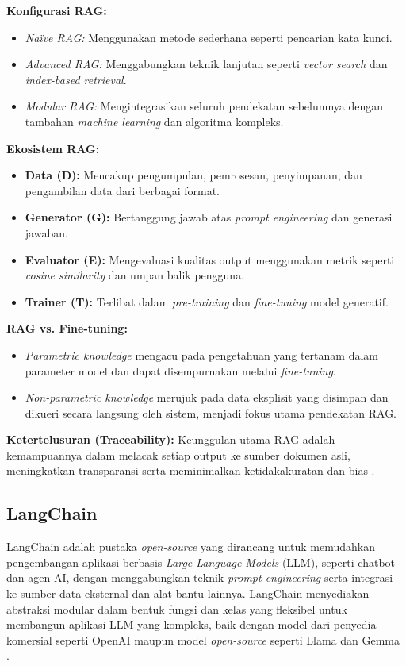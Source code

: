 \textbf{Konfigurasi RAG:}
\begin{itemize}
    \item \textit{Na\"ive RAG:} Menggunakan metode sederhana seperti pencarian kata kunci.
    \item \textit{Advanced RAG:} Menggabungkan teknik lanjutan seperti \textit{vector search} dan \textit{index-based retrieval}.
    \item \textit{Modular RAG:} Mengintegrasikan seluruh pendekatan sebelumnya dengan tambahan \textit{machine learning} dan algoritma kompleks.
\end{itemize}

\textbf{Ekosistem RAG:} 
\begin{itemize}
    \item \textbf{Data (D):} Mencakup pengumpulan, pemrosesan, penyimpanan, dan pengambilan data dari berbagai format.
    \item \textbf{Generator (G):} Bertanggung jawab atas \textit{prompt engineering} dan generasi jawaban.
    \item \textbf{Evaluator (E):} Mengevaluasi kualitas output menggunakan metrik seperti \textit{cosine similarity} dan umpan balik pengguna.
    \item \textbf{Trainer (T):} Terlibat dalam \textit{pre-training} dan \textit{fine-tuning} model generatif.
\end{itemize}

\textbf{RAG vs. Fine-tuning:} 
\begin{itemize}
    \item \textit{Parametric knowledge} mengacu pada pengetahuan yang tertanam dalam parameter model dan dapat disempurnakan melalui \textit{fine-tuning}.
    \item \textit{Non-parametric knowledge} merujuk pada data eksplisit yang disimpan dan dikueri secara langsung oleh sistem, menjadi fokus utama pendekatan RAG.
\end{itemize}

\textbf{Ketertelusuran (Traceability):} 
Keunggulan utama RAG adalah kemampuannya dalam melacak setiap output ke sumber dokumen asli, meningkatkan transparansi serta meminimalkan ketidakakuratan dan bias \citep{rothman2024rag}.

\subsection{LangChain}
LangChain adalah pustaka \textit{open-source} yang dirancang untuk memudahkan pengembangan aplikasi berbasis \textit{Large Language Models} (LLM), seperti chatbot dan agen AI, dengan menggabungkan teknik \textit{prompt engineering} serta integrasi ke sumber data eksternal dan alat bantu lainnya. LangChain menyediakan abstraksi modular dalam bentuk fungsi dan kelas yang fleksibel untuk membangun aplikasi LLM yang kompleks, baik dengan model dari penyedia komersial seperti OpenAI maupun model \textit{open-source} seperti Llama dan Gemma \citep{oshin2024learning}.

